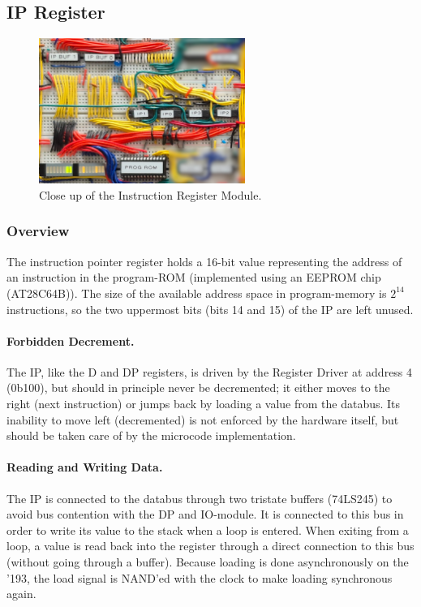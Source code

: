 
\newpage\subsection{IP Register}
\begin{figure}[H]
  \centering
  \includegraphics[width=0.6\textwidth]{img/ipregistercloseup}
  \caption{Close up of the Instruction Register Module.}
  \label{fig:iregcloseup}
\end{figure}

\subsubsection{Overview}
The instruction pointer register holds a 16-bit value representing the address of an instruction in the program-ROM (implemented using an EEPROM chip (AT28C64B)). The size of the available address space in program-memory is $2^{14}$ instructions, so the two uppermost bits (bits 14 and 15) of the IP are left unused.

\paragraph{Forbidden Decrement.} The IP, like the D and DP registers, is driven by the Register Driver at address 4 (0b100), but should in principle never be decremented; it either moves to the right (next instruction) or jumps back by loading a value from the databus. Its inability to move left (decremented) is not enforced by the hardware itself, but should be taken care of by the microcode implementation.

\paragraph{Reading and Writing Data.} The IP is connected to the databus through two tristate buffers (74LS245) to avoid bus contention with the DP and IO-module. It is connected to this bus in order to write its value to the stack when a loop is entered. When exiting from a loop, a value is read back into the register through a direct connection to this bus (without going through a buffer). Because loading is done asynchronously on the '193, the load signal is NAND'ed with the clock to make loading synchronous again.

